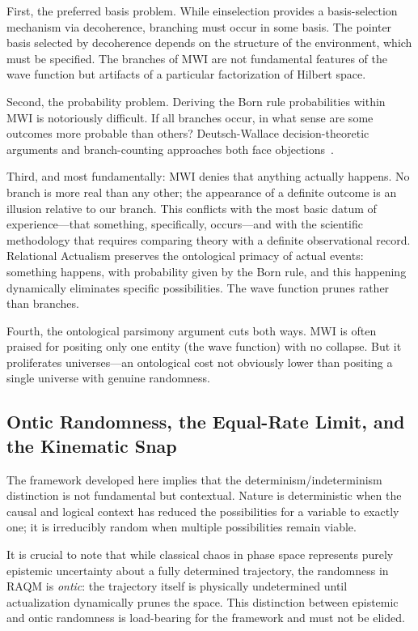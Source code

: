 \documentclass[11pt,a4paper]{article}
\theoremstyle{plain}
\theoremstyle{definition}
\theoremstyle{remark}
\begin{document}
First, the preferred basis problem. While einselection provides a basis-selection
mechanism via decoherence, branching must occur in some basis. The pointer basis
selected by decoherence depends on the structure of the environment, which must be
specified. The branches of MWI are not fundamental features of the wave function
but artifacts of a particular factorization of Hilbert space.

Second, the probability problem. Deriving the Born rule probabilities within MWI
is notoriously difficult. If all branches occur, in what sense are some outcomes
more probable than others? Deutsch-Wallace decision-theoretic arguments and
branch-counting approaches both face objections~\citep{SaundersEtAl2010}.

Third, and most fundamentally: MWI denies that anything actually happens. No
branch is more real than any other; the appearance of a definite outcome is an
illusion relative to our branch. This conflicts with the most basic datum of
experience---that something, specifically, occurs---and with the scientific
methodology that requires comparing theory with a definite observational record.
Relational Actualism preserves the ontological primacy of actual events: something
happens, with probability given by the Born rule, and this happening dynamically
eliminates specific possibilities. The wave function prunes rather than branches.

Fourth, the ontological parsimony argument cuts both ways. MWI is often praised
for positing only one entity (the wave function) with no collapse. But it
proliferates universes---an ontological cost not obviously lower than positing a
single universe with genuine randomness.

\subsection{Ontic Randomness, the Equal-Rate Limit, and the Kinematic Snap}
\label{sec:ontic}

The framework developed here implies that the determinism/indeterminism distinction
is not fundamental but contextual. Nature is deterministic when the causal and
logical context has reduced the possibilities for a variable to exactly one; it is
irreducibly random when multiple possibilities remain viable.

It is crucial to note that while classical chaos in phase space represents purely
epistemic uncertainty about a fully determined trajectory, the randomness in RAQM
is \emph{ontic}: the trajectory itself is physically undetermined until
actualization dynamically prunes the space. This distinction between epistemic and
ontic randomness is load-bearing for the framework and must not be elided.
\end{document}
